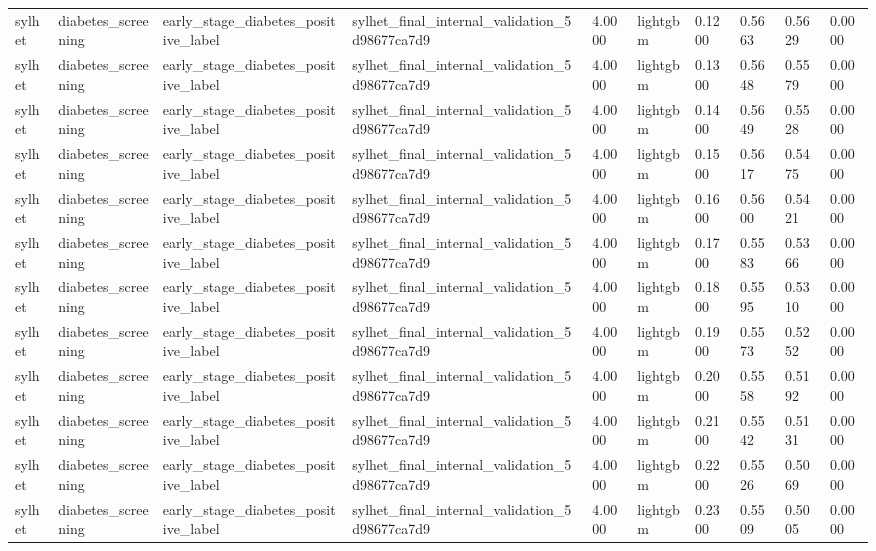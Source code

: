 \begin{tabular}{llllllllll}
sylhet & diabetes\_screening & early\_stage\_diabetes\_positive\_label & sylhet\_final\_internal\_validation\_5d98677ca7d9 & 4.0000 & lightgbm & 0.1200 & 0.5663 & 0.5629 & 0.0000 \\
sylhet & diabetes\_screening & early\_stage\_diabetes\_positive\_label & sylhet\_final\_internal\_validation\_5d98677ca7d9 & 4.0000 & lightgbm & 0.1300 & 0.5648 & 0.5579 & 0.0000 \\
sylhet & diabetes\_screening & early\_stage\_diabetes\_positive\_label & sylhet\_final\_internal\_validation\_5d98677ca7d9 & 4.0000 & lightgbm & 0.1400 & 0.5649 & 0.5528 & 0.0000 \\
sylhet & diabetes\_screening & early\_stage\_diabetes\_positive\_label & sylhet\_final\_internal\_validation\_5d98677ca7d9 & 4.0000 & lightgbm & 0.1500 & 0.5617 & 0.5475 & 0.0000 \\
sylhet & diabetes\_screening & early\_stage\_diabetes\_positive\_label & sylhet\_final\_internal\_validation\_5d98677ca7d9 & 4.0000 & lightgbm & 0.1600 & 0.5600 & 0.5421 & 0.0000 \\
sylhet & diabetes\_screening & early\_stage\_diabetes\_positive\_label & sylhet\_final\_internal\_validation\_5d98677ca7d9 & 4.0000 & lightgbm & 0.1700 & 0.5583 & 0.5366 & 0.0000 \\
sylhet & diabetes\_screening & early\_stage\_diabetes\_positive\_label & sylhet\_final\_internal\_validation\_5d98677ca7d9 & 4.0000 & lightgbm & 0.1800 & 0.5595 & 0.5310 & 0.0000 \\
sylhet & diabetes\_screening & early\_stage\_diabetes\_positive\_label & sylhet\_final\_internal\_validation\_5d98677ca7d9 & 4.0000 & lightgbm & 0.1900 & 0.5573 & 0.5252 & 0.0000 \\
sylhet & diabetes\_screening & early\_stage\_diabetes\_positive\_label & sylhet\_final\_internal\_validation\_5d98677ca7d9 & 4.0000 & lightgbm & 0.2000 & 0.5558 & 0.5192 & 0.0000 \\
sylhet & diabetes\_screening & early\_stage\_diabetes\_positive\_label & sylhet\_final\_internal\_validation\_5d98677ca7d9 & 4.0000 & lightgbm & 0.2100 & 0.5542 & 0.5131 & 0.0000 \\
sylhet & diabetes\_screening & early\_stage\_diabetes\_positive\_label & sylhet\_final\_internal\_validation\_5d98677ca7d9 & 4.0000 & lightgbm & 0.2200 & 0.5526 & 0.5069 & 0.0000 \\
sylhet & diabetes\_screening & early\_stage\_diabetes\_positive\_label & sylhet\_final\_internal\_validation\_5d98677ca7d9 & 4.0000 & lightgbm & 0.2300 & 0.5509 & 0.5005 & 0.0000 \\

\end{tabular}
